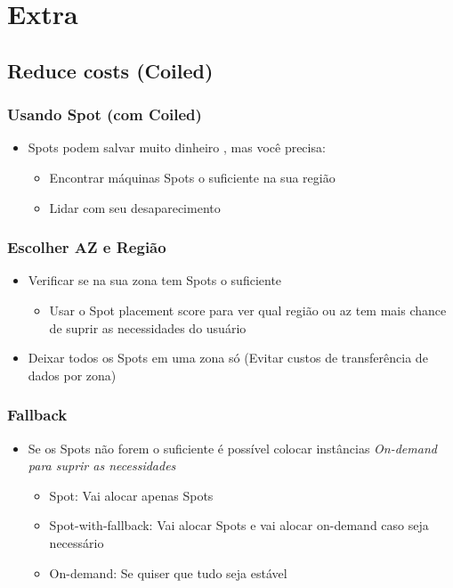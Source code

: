 \section{Extra}

\subsection{Reduce costs (Coiled)}

\begin{frame}
	\frametitle{Usando Spot (com Coiled)}
	\begin{itemize}
		\item Spots podem salvar muito dinheiro \cite{Spot}, mas você precisa:
			\begin{itemize}
				\item Encontrar máquinas Spots o suficiente na sua região
				\item Lidar com seu desaparecimento
			\end{itemize}
	\end{itemize}
\end{frame}

\begin{frame}
	\frametitle{Escolher AZ e Região \cite{AWSCETips}}
	\begin{itemize}
		\item Verificar se na sua zona tem Spots o suficiente
			\begin{itemize}
				\item  Usar o Spot placement score para ver qual região ou az tem mais chance de suprir as necessidades do usuário
			\end{itemize}
		\item Deixar todos os Spots em uma zona só (Evitar custos de transferência de dados por zona)
	\end{itemize}
\end{frame}

\begin{frame}
	\frametitle{Fallback}
	\begin{itemize}
		\item Se os Spots não forem o suficiente é possível colocar instâncias \it{On-demand} para suprir as necessidades
			\begin{itemize}
				\item Spot: Vai alocar apenas Spots
				\item Spot-with-fallback: Vai alocar Spots e vai alocar on-demand caso seja necessário
				\item On-demand: Se quiser que tudo seja estável
			\end{itemize}
	\end{itemize}
\end{frame}
